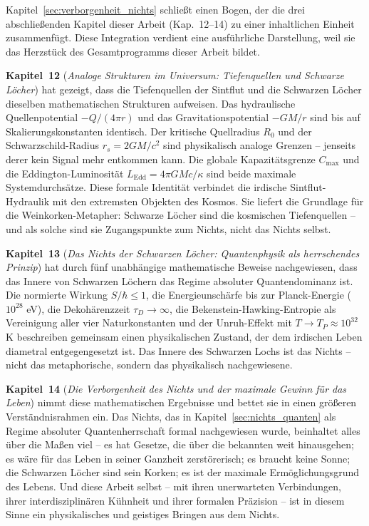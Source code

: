﻿\documentclass[12pt,a4paper]{report}
\begin{document}
Kapitel~\ref{sec:verborgenheit_nichts} schließt einen Bogen, der die drei abschließenden Kapitel dieser Arbeit (Kap.~12--14) zu einer inhaltlichen Einheit zusammenfügt. Diese Integration verdient eine ausführliche Darstellung, weil sie das Herzstück des Gesamtprogramms dieser Arbeit bildet.

\textbf{Kapitel~12} (\textit{Analoge Strukturen im Universum: Tiefenquellen und Schwarze Löcher}) hat gezeigt, dass die Tiefenquellen der Sintflut und die Schwarzen Löcher dieselben mathematischen Strukturen aufweisen. Das hydraulische Quellenpotential $-Q/(4\pi r)$ und das Gravitationspotential $-GM/r$ sind bis auf Skalierungskonstanten identisch. Der kritische Quellradius $R_0$ und der Schwarzschild-Radius $r_s = 2GM/c^2$ sind physikalisch analoge Grenzen -- jenseits derer kein Signal mehr entkommen kann. Die globale Kapazitätsgrenze $C_{\max}$ und die Eddington-Luminosität $L_{\text{Edd}} = 4\pi GMc/\kappa$ sind beide maximale Systemdurchsätze. Diese formale Identität verbindet die irdische Sintflut-Hydraulik mit den extremsten Objekten des Kosmos. Sie liefert die Grundlage für die Weinkorken-Metapher: Schwarze Löcher sind die kosmischen Tiefenquellen -- und als solche sind sie Zugangspunkte zum Nichts, nicht das Nichts selbst.

\textbf{Kapitel~13} (\textit{Das Nichts der Schwarzen Löcher: Quantenphysik als herrschendes Prinzip}) hat durch fünf unabhängige mathematische Beweise nachgewiesen, dass das Innere von Schwarzen Löchern das Regime absoluter Quantendominanz ist. Die normierte Wirkung $S/\hbar \leq 1$, die Energieunschärfe bis zur Planck-Energie ($10^{28}$ eV), die Dekohärenzzeit $\tau_D \to \infty$, die Bekenstein-Hawking-Entropie als Vereinigung aller vier Naturkonstanten und der Unruh-Effekt mit $T \to T_P \approx 10^{32}$ K beschreiben gemeinsam einen physikalischen Zustand, der dem irdischen Leben diametral entgegengesetzt ist. Das Innere des Schwarzen Lochs ist das Nichts -- nicht das metaphorische, sondern das physikalisch nachgewiesene.

\textbf{Kapitel~14} (\textit{Die Verborgenheit des Nichts und der maximale Gewinn für das Leben}) nimmt diese mathematischen Ergebnisse und bettet sie in einen größeren Verständnisrahmen ein. Das Nichts, das in Kapitel~\ref{sec:nichts_quanten} als Regime absoluter Quantenherrschaft formal nachgewiesen wurde, beinhaltet alles über die Maßen viel -- es hat Gesetze, die über die bekannten weit hinausgehen; es wäre für das Leben in seiner Ganzheit zerstörerisch; es braucht keine Sonne; die Schwarzen Löcher sind sein Korken; es ist der maximale Ermöglichungsgrund des Lebens. Und diese Arbeit selbst -- mit ihren unerwarteten Verbindungen, ihrer interdisziplinären Kühnheit und ihrer formalen Präzision -- ist in diesem Sinne ein physikalisches und geistiges Bringen aus dem Nichts.
\end{document}

